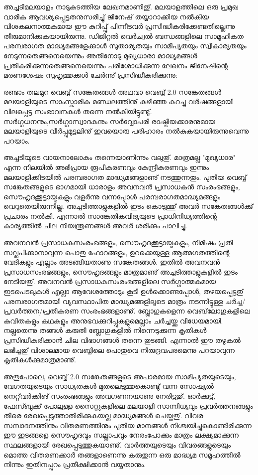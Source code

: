 \vskip 2pt

\begin{framed}
അച്ചടിമലയാളം നാടുകടത്തിയ ലേഖനമാണിതു്. മലയാളത്തിലെ ഒരു പ്രമുഖ വാരിക ആവശ്യപ്പെട്ടതനുസരിച്ചു് ജിനേഷ് 
തയ്യാറാക്കിയ നല്‍കിയ വിശകലനാത്മകമായ ഈ കുറിപ്പു് പിന്നീടവര്‍ പ്രസിദ്ധീകരിക്കേണ്ടതില്ലെന്നു തീരുമാനിക്കുകയായിരുന്നു.
 ഡിജിറ്റല്‍ വെര്‍ച്വല്‍ ബന്ധങ്ങളിലെ സാമൂഹികത പരമ്പരാഗത മാദ്ധ്യമങ്ങളേക്കാള്‍ സുതാര്യതയും സാമീപ്യതയും സ്വീകാര്യതയും 
നേടുന്നതെങ്ങനെയെന്നും അതിനോടു മുഖ്യധാരാ മാദ്ധ്യമങ്ങള്‍ പ്രതികരിക്കുന്നതെങ്ങനെയെന്നും പരിശോധിക്കുന്ന ലേഖനം 
ജിനേഷിന്റെ മരണശേഷം സുഹൃത്തുക്കള്‍ ചേര്‍ന്നു് പ്രസിദ്ധീകരിക്കുന്നു:
\end{framed}


രണ്ടാം തലമുറ വെബ്ബ് സങ്കേതങ്ങള്‍ അഥവാ വെബ്ബ് 2.0 സങ്കേതങ്ങള്‍ മലയാളിയുടെ സാംസ്കാരിക മണ്ഡലത്തിനു് കഴിഞ്ഞ കുറച്ചു 
വര്‍ഷങ്ങളായി വിലപ്പെട്ട സംഭാവനകള്‍ തന്നെ നല്‍കിയിട്ടുണ്ടു്. സര്‍ഗ്ഗധനനും,സര്‍ഗ്ഗാസ്വാദകനും സര്‍വ്വോപരി രാഷ്ട്രീയക്കാരനുമായ 
മലയാളിയുടെ വീര്‍പ്പുമുട്ടലിനു് ഇവയൊരു പരിഹാരം നല്‍കുകയായിരുന്നുവെന്നു പറയാം.

അച്ചടിയുടെ വായനാലോകം തന്നെയാണിന്നും വലുതു്. മാത്രമല്ല "മുഖ്യധാര" എന്ന നിലയില്‍ അഭിപ്രായ രൂപീകരണവും 
കേന്ദ്രീകരണവും ഇന്നും മലയാളിക്കിടയില്‍ പരമ്പരാഗത മാദ്ധ്യമങ്ങളാണു് നടത്തുന്നതും. പുതിയ വെബ്ബ് സങ്കേതങ്ങളുടെ ഭാഗമായി
 ധാരാളം അവനവന്‍ പ്രസാധകന്‍ സംരംഭങ്ങളും, സൌഹൃദക്കൂട്ടായ്മകളും വളര്‍ന്നു വന്നപ്പോള്‍ പരമ്പരാഗതമാദ്ധ്യമങ്ങളും 
വെറുതെയിരുന്നില്ല. അച്ചടിത്താളുകളില്‍ ഇടം കൊടുത്തു് അവര്‍ സങ്കേതങ്ങള്‍ക്കു് പ്രചാരം നല്‍കി. എന്നാല്‍ സാങ്കേതികവിദ്യയുടെ
 പ്രാധിനിധ്യത്തിന്റെ കാര്യത്തില്‍ ചില നിയന്ത്രണങ്ങള്‍ അവര്‍ ശരിക്കും പാലിച്ചു.

അവനവന്‍ പ്രസാധകസംരംഭങ്ങളും, സൌഹൃദക്കൂട്ടായ്മകളും, നിമിഷം പ്രതി സല്ലപിക്കാനാവുന്ന പൊതു ഫോറങ്ങളും, ഉറക്കെയുള്ള 
ആത്മഗതത്തിന്റെ വേദികളും എല്ലാം അടങ്ങിയതാണു സങ്കേതങ്ങള്‍. ഇതില്‍ അവനവന്‍ പ്രസാധസംരഭങ്ങളും, സൌഹൃദങ്ങളും
 മാത്രമാണു് അച്ചടിത്താളുകളില്‍ ഇടം നേടിയതു്. അവനവന്‍ പ്രസാധകസംരംഭങ്ങളിലെ സര്‍ഗ്ഗാത്മകമായ ഇടപെടലുകള്‍ എല്ലാ 
ആവേശത്തോടും കൂടി ഉള്‍ക്കൊണ്ടപ്പോള്‍, തഴയപ്പെട്ടതു് പരമ്പരാഗതമായി വ്യവസ്ഥാപിത മാദ്ധ്യമങ്ങളിലൂടെ മാത്രം നടന്നിട്ടുള്ള 
ചര്‍ച്ച/പ്രവര്‍ത്തന/പ്രതികരണ സംരംഭങ്ങളാണു്. ബ്ലോഗുകളെന്ന വെബ്‌ലോഗുകളിലെ കവിതകളും കഥകളും 
അനുഭവക്കുറിപ്പുകളുമെല്ലാം ചര്‍ച്ചയ്ക്കു വിധേയമായി. നല്ലതെന്നു തങ്ങള്‍ കരുതി ബ്ലോഗുകളില്‍ നിന്നെടുക്കുന്ന കൃതികള്‍ 
പ്രസിദ്ധീകരിക്കാന്‍ ചില വിഭാഗങ്ങള്‍ തന്നെ തുടങ്ങി. എന്നാല്‍ ഈ തഴുകല്‍ ലഭിച്ചതു് വിശാലമായ വെബ്ബിലെ പൊതുവെ 
നിരുദ്രവപരമെന്നു പറയാവുന്ന കൃതികള്‍ക്കുമാത്രമാണു്.

അതുപോലെ, വെബ്ബ് 2.0 സങ്കേതങ്ങളുടെ അപാരമായ സാമീപ്യതയുടെയും, വേഗതയുടെയും സാധ്യതകള്‍ മുതലെടുത്തുകൊണ്ടു് വന്ന
 സോഷ്യല്‍ നെറ്റ്‌വര്‍ക്കിങ് സംരംഭങ്ങളും അവഗണനയാണു നേരിട്ടതു്. ഓര്‍ക്കുട്ട്, ഫേസ്ബുക്ക് പോലുള്ള സൈറ്റുകളിലെ മലയാളി
 സാന്നിധ്യവും പ്രവര്‍ത്തനങ്ങളും തീരെ രേഖപ്പെടുത്താതിരിക്കുകയല്ല മാദ്ധ്യമങ്ങള്‍ ചെയ്തതു്. വിവര സമ്പാദനത്തിനും 
വിതരണത്തിനും പുതിയ മാനങ്ങള്‍ നിശ്ചയിച്ചുകൊണ്ടിരിക്കുന്ന ഈ ഇടങ്ങളെ സൌഹൃദവും സല്ലാപവും നേരംപോക്കും മാത്രം 
ലക്ഷ്യമാക്കുന്ന സ്ഥലങ്ങളായി രേഖപ്പെടുത്തുകയാണു്. വാര്‍ത്തയുടെയും വിവരങ്ങളുടെയും മൊത്ത വിതരണക്കാര്‍ തങ്ങളാണെന്നു
 കരുതുന്ന ഒരു മാദ്ധ്യമ സമൂഹത്തില്‍ നിന്നും ഇതിനപ്പുറം പ്രതീക്ഷിക്കാന്‍ വയ്യതാനും.

